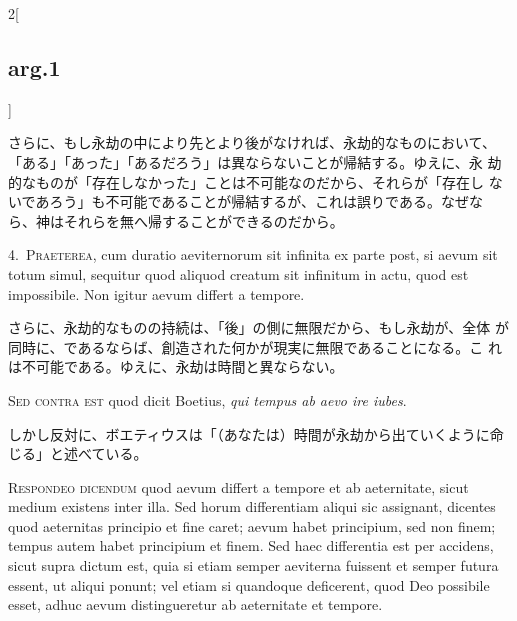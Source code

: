 \documentclass[paper=a4paper,fontsize=10pt,jafontsize=9pt,titlepage]{jlreq}
\begin{document}
\begin{paracol}{2}[\subsection{arg.1}]
\switchcolumn

さらに、もし永劫の中により先とより後がなければ、永劫的なものにおいて、
「ある」「あった」「あるだろう」は異ならないことが帰結する。ゆえに、永
劫的なものが「存在しなかった」ことは不可能なのだから、それらが「存在し
ないであろう」も不可能であることが帰結するが、これは誤りである。なぜな
ら、神はそれらを無へ帰することができるのだから。


4.~{\scshape Praeterea}, cum duratio aeviternorum sit infinita ex parte
 post, si aevum sit totum simul, sequitur quod aliquod creatum sit
 infinitum in actu, quod est impossibile. Non igitur aevum differt a
 tempore.

\switchcolumn

さらに、永劫的なものの持続は、「後」の側に無限だから、もし永劫が、全体
が同時に、であるならば、創造された何かが現実に無限であることになる。こ
れは不可能である。ゆえに、永劫は時間と異ならない。

\switchcolumn*[\subsection{s.c.}]

{\scshape Sed contra est} quod dicit Boetius, {\itshape qui tempus ab
 aevo ire iubes}.

\switchcolumn

しかし反対に、ボエティウスは「（あなたは）時間が永劫から出ていくように命
じる」と述べている。


{\scshape Respondeo dicendum} quod aevum differt a tempore et ab
aeternitate, sicut medium existens inter illa. Sed horum differentiam
aliqui sic assignant, dicentes quod aeternitas principio et fine caret;
aevum habet principium, sed non finem; tempus autem habet principium et
finem. Sed haec differentia est per accidens, sicut supra dictum est,
quia si etiam semper aeviterna fuissent et semper futura essent, ut
aliqui ponunt; vel etiam si quandoque deficerent, quod Deo possibile
esset, adhuc aevum distingueretur ab aeternitate et tempore.

\switchcolumn


\end{paracol}
\end{document}

